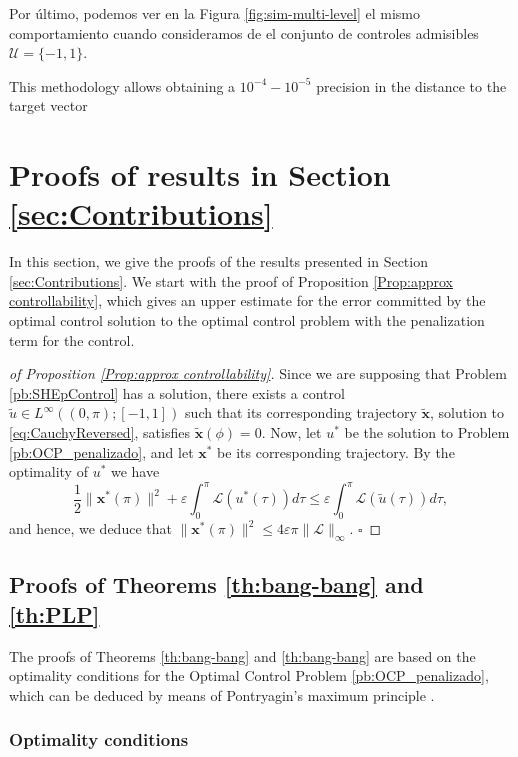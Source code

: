 \documentclass[twocolumn]{autart}    %
\begin{document}
Por último, podemos ver en la Figura \ref{fig:sim-multi-level} el mismo comportamiento cuando consideramos de el conjunto de controles admisibles $\mathcal{U} = \{-1,1\}$.
 

This methodology allows obtaining a $10^{-4}-10^{-5}$ precision in the distance to the target vector


\section{Proofs of results in Section \ref{sec:Contributions}}\label{sec:Proof}

In this section, we give the proofs of the results presented in Section \ref{sec:Contributions}. We start with the proof of Proposition \ref{Prop:approx controllability}, which gives an upper estimate for the error committed by the optimal control solution to the optimal control problem with the penalization term for the control. 

\bigskip

\begin{proof}[of Proposition \ref{Prop:approx controllability}]
Since we are supposing that Problem \ref{pb:SHEpControl} has a solution, 
there exists a control $\tilde{u}\in L^\infty((0,\pi); [-1,1])$ such that
its corresponding trajectory $\tilde{\bm{x}}$, solution to \eqref{eq:CauchyReversed}, satisfies $\tilde{\bm{x}} (\phi) = 0$.
Now, let $u^\ast$ be the solution to Problem \ref{pb:OCP_penalizado}, and let $\bm{x}^\ast$ be its corresponding trajectory. By the optimality of $u^\ast$ we have
$$
\dfrac{1}{2} \| \bm{x}^\ast(\pi)\|^2 +\varepsilon \int_0^\pi \mathcal{L}(u^\ast(\tau))d\tau \leq \varepsilon \int_0^\pi \mathcal{L}(\tilde{u}(\tau))d\tau,
$$
and hence, we deduce that
$\| \bm{x}^\ast (\pi)\|^2 \leq 4 \varepsilon \pi \| \mathcal{L}\|_\infty.  $ \hfill $\square$
\end{proof}

\subsection{Proofs of Theorems \ref{th:bang-bang} and \ref{th:PLP}}

The proofs of Theorems \ref{th:bang-bang} and \ref{th:bang-bang} are based on the optimality conditions for the Optimal Control Problem \ref{pb:OCP_penalizado}, which can be deduced by means of Pontryagin's maximum principle \cite[Chapter~2.7]{bryson1975applied}.

\subsubsection{Optimality conditions}
\end{document}
